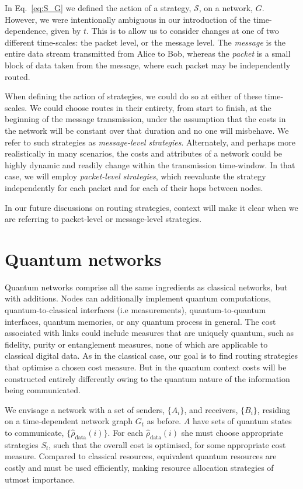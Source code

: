 \documentclass[aps,rmp,twocolumn,amsmath,amssymb,nofootinbib,superscriptaddress]{revtex4}
\begin{document}
In Eq.~\ref{eq:S_G} we defined the action of a strategy, $\mathcal{S}$, on a network, $G$. However, we were intentionally ambiguous in our introduction of the time-dependence, given by $t$. This is to allow us to consider changes at one of two different time-scales: the packet level, or the message level. The \emph{message} is the entire data stream transmitted from Alice to Bob, whereas the \emph{packet} is a small block of data taken from the message, where each packet may be independently routed.

When defining the action of strategies, we could do so at either of these time-scales. We could choose routes in their entirety, from start to finish, at the beginning of the message transmission, under the assumption that the costs in the network will be constant over that duration and no one will misbehave. We refer to such strategies as \emph{message-level strategies}. Alternately, and perhaps more realistically in many scenarios, the costs and attributes of a network could be highly dynamic and readily change within the transmission time-window. In that case, we will employ \emph{packet-level strategies}, which reevaluate the strategy independently for each packet and for each of their hops between nodes.

In our future discussions on routing strategies, context will make it clear when we are referring to packet-level or message-level strategies.

%
%

\section{Quantum networks} \label{sec:quant_net}

Quantum networks comprise all the same ingredients as classical networks, but with additions. Nodes can additionally implement quantum computations, quantum-to-classical interfaces (i.e measurements), quantum-to-quantum interfaces, quantum memories, or any quantum process in general. The cost associated with links could include measures that are uniquely quantum, such as fidelity, purity or entanglement measures, none of which are applicable to classical digital data. As in the classical case, our goal is to find routing strategies that optimise a chosen cost measure. But in the quantum context costs will be constructed entirely differently owing to the quantum nature of the information being communicated.

We envisage a network with a set of senders, $\{A_i\}$, and receivers, $\{B_i\}$, residing on a time-dependent network graph $G_t$ as before. $A$ have sets of quantum states to communicate, $\{\hat\rho_\mathrm{data}(i)\}$. For each $\hat\rho_\mathrm{data}(i)$ she must choose appropriate strategies $S_t$, such that the overall cost is optimised, for some appropriate cost measure. Compared to classical resources, equivalent quantum resources are costly and must be used efficiently, making resource allocation strategies of utmost importance.
\end{document}
